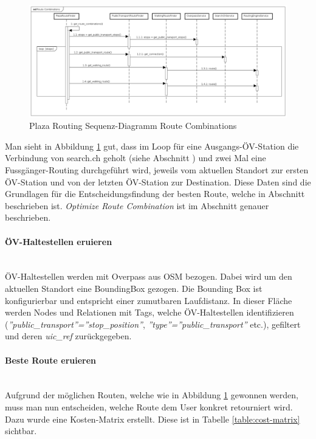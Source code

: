 \begin{figure}[ht]
    \centering
    \includegraphics[width=1\linewidth]{projectdoc/img/sequence_diagram_plaza_routing_route_comb}
    \caption[Plaza Routing Sequenz-Diagramm Route Combinations]{Plaza Routing Sequenz-Diagramm Route Combinations}
    \label{fig:sequence_diagram_plaza_routing_route_combs}
\end{figure}

Man sieht in Abbildung \ref{fig:sequence_diagram_plaza_routing_route_combs} gut, dass im Loop für eine Ausgangs-ÖV-Station die Verbindung von search.ch \cite{search_ch_route_api} geholt (siehe Abschnitt ) und zwei Mal eine Fussgänger-Routing durchgeführt wird, jeweils vom aktuellen Standort zur ersten ÖV-Station und von der letzten ÖV-Station zur Destination. Diese Daten sind die Grundlagen für die Entscheidungsfindung der besten Route, welche in Abschnitt  beschrieben ist. \emph{Optimize Route Combination} ist im Abschnitt  genauer beschrieben.

\paragraph{ÖV-Haltestellen eruieren}\label{impl:Plaza Routing ÖV-Haltestellen eruieren}~\\
ÖV-Haltestellen werden mit Overpass \cite{wiki:overpass} aus \ac{OSM} bezogen. Dabei wird um den aktuellen Standort eine \gls{BoundingBox} gezogen. Die Bounding Box ist konfigurierbar und entspricht einer zumutbaren Laufdistanz. In dieser Fläche werden Nodes und Relationen mit Tags, welche ÖV-Haltestellen identifizieren (\emph{''public\_transport''=''stop\_position''}, \emph{''type''=''public\_transport''} etc.), gefiltert und deren \emph{uic\_ref} zurückgegeben.

\paragraph{Beste Route eruieren}\label{impl:Plaza Routing Beste Route eruieren}~\\
Aufgrund der möglichen Routen, welche wie in Abbildung \ref{fig:sequence_diagram_plaza_routing_route_combs} gewonnen werden, muss man nun entscheiden, welche Route dem User konkret retourniert wird. Dazu wurde eine Kosten-Matrix erstellt. Diese ist in Tabelle \ref{table:cost-matrix} sichtbar.


